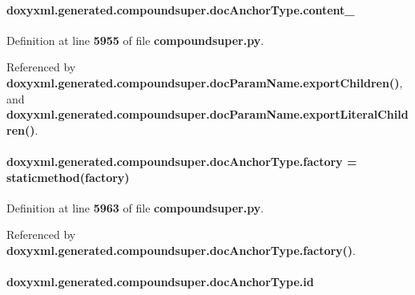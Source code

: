 \paragraph[{content\+\_\+}]{\setlength{\rightskip}{0pt plus 5cm}doxyxml.\+generated.\+compoundsuper.\+doc\+Anchor\+Type.\+content\+\_\+}\label{classdoxyxml_1_1generated_1_1compoundsuper_1_1docAnchorType_af98bc6ba001fa763546afa975af99958}


Definition at line {\bf 5955} of file {\bf compoundsuper.\+py}.



Referenced by {\bf doxyxml.\+generated.\+compoundsuper.\+doc\+Param\+Name.\+export\+Children()}, and {\bf doxyxml.\+generated.\+compoundsuper.\+doc\+Param\+Name.\+export\+Literal\+Children()}.

\paragraph[{factory}]{\setlength{\rightskip}{0pt plus 5cm}doxyxml.\+generated.\+compoundsuper.\+doc\+Anchor\+Type.\+factory = staticmethod(factory)\hspace{0.3cm}{\ttfamily [static]}}\label{classdoxyxml_1_1generated_1_1compoundsuper_1_1docAnchorType_a42da8515f8de81970b17fb5c4780a282}


Definition at line {\bf 5963} of file {\bf compoundsuper.\+py}.



Referenced by {\bf doxyxml.\+generated.\+compoundsuper.\+doc\+Anchor\+Type.\+factory()}.

\paragraph[{id}]{\setlength{\rightskip}{0pt plus 5cm}doxyxml.\+generated.\+compoundsuper.\+doc\+Anchor\+Type.\+id}\label{classdoxyxml_1_1generated_1_1compoundsuper_1_1docAnchorType_a0a4aa0bc95495ef6aa70e490e54837a9}


